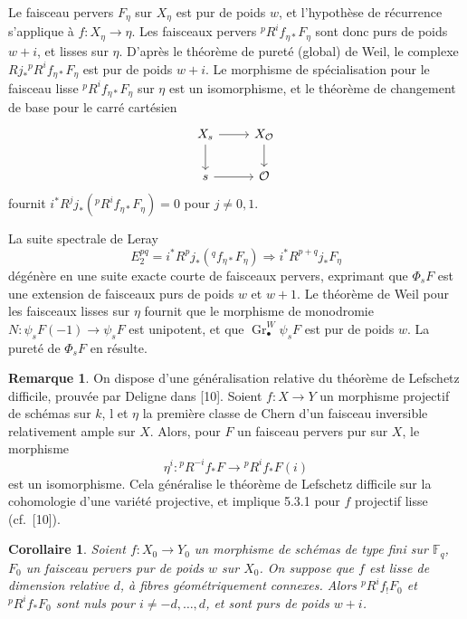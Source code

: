 \documentclass[12pt,a4paper]{article}
\theoremstyle{plain}
\newtheorem{corollary}[theorem]{Corollaire}
\theoremstyle{definition}
\newtheorem{remark}[theorem]{Remarque}
\DeclareMathOperator{\Gr}{Gr}
\begin{document}
Le faisceau pervers $F_{\eta}$ sur $X_{\eta}$ est pur de poids $w$, et l'hypoth\`{e}se de r\'{e}currence s'applique \`{a} $f: X_{\eta} \to \eta$. Les faisceaux pervers ${}^{p}R^{i}f_{\eta*}F_{\eta}$ sont donc purs de poids $w+i$, et lisses sur $\eta$. D'apr\`{e}s le th\'{e}or\`{e}me de puret\'{e} (global) de Weil, le complexe $Rj_{*}{}^{p}R^{i}f_{\eta*}F_{\eta}$ est pur de poids $w+i$. Le morphisme de sp\'{e}cialisation pour le faisceau lisse ${}^{p}R^{i}f_{\eta*}F_{\eta}$ sur $\eta$ est un isomorphisme, et le th\'{e}or\`{e}me de changement de base pour le carr\'{e} cart\'{e}sien
\[
\begin{tikzcd}
X_{s} \rar \dar & X_{\mathcal{O}} \dar \\
s \rar & \mathcal{O}
\end{tikzcd}
\]
fournit $i^{*}R^{j}j_{*}({}^{p}R^{i}f_{\eta*}F_{\eta}) = 0$ pour $j \neq 0,1$.

La suite spectrale de Leray
\[
E_{2}^{pq} = i^{*}R^{p}j_{*}({}^{q}f_{\eta*}F_{\eta}) \Rightarrow i^{*}R^{p+q}j_{*}F_{\eta}
\]
d\'{e}g\'{e}n\`{e}re en une suite exacte courte de faisceaux pervers, exprimant que $\Phi_{s}F$ est une extension de faisceaux purs de poids $w$ et $w+1$. Le th\'{e}or\`{e}me de Weil pour les faisceaux lisses sur $\eta$ fournit que le morphisme de monodromie $N: \psi_{s}F(-1) \to \psi_{s}F$ est unipotent, et que $\Gr^{W}_{\bullet}\psi_{s}F$ est pur de poids $w$. La puret\'{e} de $\Phi_{s}F$ en r\'{e}sulte.

\begin{remark}\label{rem:5.3.8}
On dispose d'une g\'{e}n\'{e}ralisation relative du th\'{e}or\`{e}me de Lefschetz difficile, prouv\'{e}e par Deligne dans [10]. Soient $f: X \to Y$ un morphisme projectif de sch\'{e}mas sur $k$, l et $\eta$ la premi\`{e}re classe de Chern d'un faisceau inversible relativement ample sur $X$. Alors, pour $F$ un faisceau pervers pur sur $X$, le morphisme
\[
\eta^{i}: {}^{p}R^{-i}f_{*}F \longrightarrow {}^{p}R^{i}f_{*}F(i)
\]
est un isomorphisme. Cela g\'{e}n\'{e}ralise le th\'{e}or\`{e}me de Lefschetz difficile sur la cohomologie d'une vari\'{e}t\'{e} projective, et implique 5.3.1 pour $f$ projectif lisse (cf.\ [10]).
\end{remark}

\begin{corollary}\label{cor:5.3.9}
Soient $f: X_{0} \to Y_{0}$ un morphisme de sch\'{e}mas de type fini sur $\mathbb{F}_{q}$, $F_{0}$ un faisceau pervers pur de poids $w$ sur $X_{0}$. On suppose que $f$ est lisse de dimension relative $d$, \`{a} fibres g\'{e}om\'{e}triquement connexes. Alors ${}^{p}R^{i}f_{!}F_{0}$ et ${}^{p}R^{i}f_{*}F_{0}$ sont nuls pour $i \neq -d,\ldots,d$, et sont purs de poids $w+i$.
\end{corollary}
\end{document}

